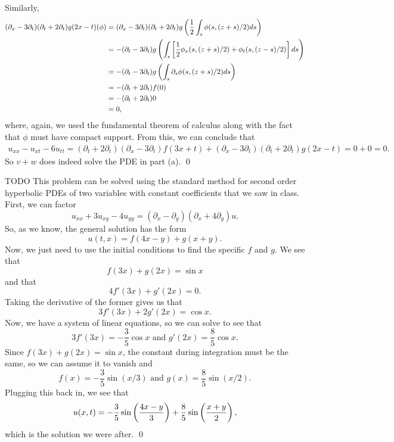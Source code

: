 \documentclass{article}
\renewcommand{\d}{\partial}
\begin{document}
\begin{enumerate}[(a)]
    \hop 
    Similarly,
    \begin{align*}
        (\d_x - 3\d_t)(\d_t + 2\d_t)g(2x - t)(\phi) &= (\d_x - 3\d_t)(\d_t + 2\d_t)g\del{\frac{1}{2}\int_s \phi(s, (z+s)/2)ds} \\
        &=-(\d_t - 3\d_t)g\del{\int_s \sbr{\frac{1}{2}\phi_x(s, (z+s)/2) + \phi_t(s, (z-s)/2)}ds}\\
        &= -(\d_t - 3\d_t)g\del{\int_s \d_s \phi(s, (z+s)/2)ds} \\
        &= -(\d_t + 2\d_t)f(0)\\
        &= -(\d_t + 2\d_t)0\\
        &=0,
    \end{align*}
    where, again, we used the fundamental theorem of calculus along with the fact that $\phi$ must have compact support. 
    \hop 
    From this, we can conclude that 
    \begin{align*}
        u_{xx}-u_{xt}-6u_{tt} = (\d_t + 2\d_t)(\d_x - 3\d_t)f(3x + t) +  (\d_x - 3\d_t)(\d_t + 2\d_t)g(2x-t) = 0+0 = 0.
    \end{align*}
    So $v+w$ does indeed solve the PDE in part (a). \qed
\end{enumerate}


\newpage
{} TODO \tri
\hop
\solution This problem can be solved using the standard method for second order hyperbolic PDEs of two variables with constant coefficients that we saw in class. 
\hop 
First, we can factor 
\[u_{xx} + 3u_{xy} -4u_{yy} = (\d_x - \d_y)(\d_x + 4\d_y)u.\]
So, as we know, the general solution has the form 
\[u(t,x) = f(4x - y)+ g(x+y).\]
Now, we just need to use the initial conditions to find the specific $f$ and $g$. We see that 
\[f(3x)+g(2x) = \sin x\]
and that 
\[4f'(3x) + g'(2x) = 0.\]
Taking the derivative of the former gives us that 
\[3f'(3x)+2g'(2x) = \cos x.\]
Now, we have a system of linear equations, so we can solve to see that 
\[3f'(3x) = - \frac{3}{5}\cos x \text{ and } g'(2x) = \frac{8}{5} \cos x .\]
Since $f(3x) + g(2x) = \sin x$, the constant during integration must be the same, so we can assume it to vanish and
\[f(x) = -\frac{3}{5}\sin(x/3) \text{ and } g(x) = \frac{8}{5}\sin(x/2).\]
Plugging this back in, we see that 
\[u(x,t) =  -\frac{3}{5}\sin\del{\frac{4x-y}{3}} + \frac{8}{5}\sin\del{\frac{x+y}{2}},\]
which is the solution we were after. \qed
\end{document}

